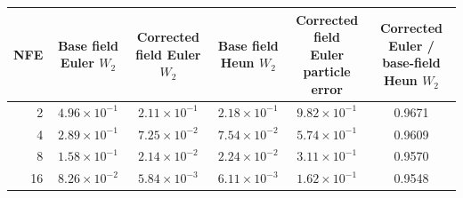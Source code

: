\begin{tabular}{rccccc}
\toprule
NFE & \shortstack{Base field\\Euler $W_2$} & \shortstack{Corrected field\\Euler $W_2$} & \shortstack{Base field\\Heun $W_2$} & \shortstack{Corrected field\\Euler particle error} & \shortstack{Corrected Euler /\\base-field Heun $W_2$} \\
\midrule
2 & $4.96\times10^{-1}$ & $2.11\times10^{-1}$ & $2.18\times10^{-1}$ & $9.82\times10^{-1}$ & 0.9671 \\
4 & $2.89\times10^{-1}$ & $7.25\times10^{-2}$ & $7.54\times10^{-2}$ & $5.74\times10^{-1}$ & 0.9609 \\
8 & $1.58\times10^{-1}$ & $2.14\times10^{-2}$ & $2.24\times10^{-2}$ & $3.11\times10^{-1}$ & 0.9570 \\
16 & $8.26\times10^{-2}$ & $5.84\times10^{-3}$ & $6.11\times10^{-3}$ & $1.62\times10^{-1}$ & 0.9548 \\
\bottomrule
\end{tabular}
